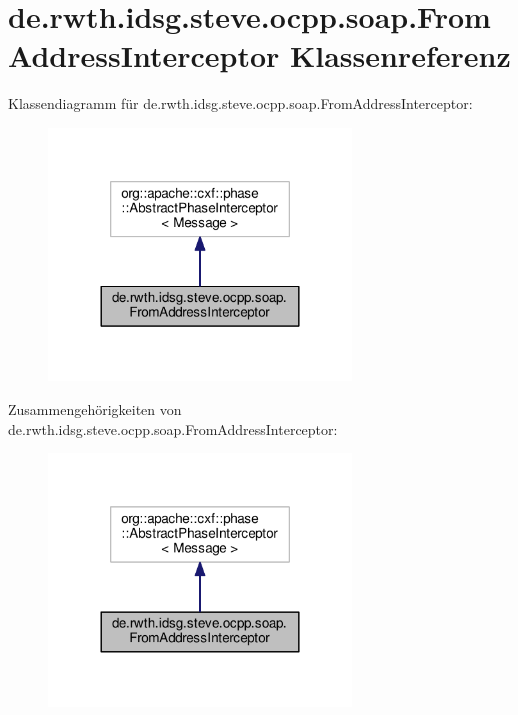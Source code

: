 \hypertarget{classde_1_1rwth_1_1idsg_1_1steve_1_1ocpp_1_1soap_1_1_from_address_interceptor}{\section{de.\-rwth.\-idsg.\-steve.\-ocpp.\-soap.\-From\-Address\-Interceptor Klassenreferenz}
\label{classde_1_1rwth_1_1idsg_1_1steve_1_1ocpp_1_1soap_1_1_from_address_interceptor}
}


Klassendiagramm für de.\-rwth.\-idsg.\-steve.\-ocpp.\-soap.\-From\-Address\-Interceptor\-:\nopagebreak
\begin{figure}[H]
\begin{center}
\leavevmode
\includegraphics[width=228pt]{classde_1_1rwth_1_1idsg_1_1steve_1_1ocpp_1_1soap_1_1_from_address_interceptor__inherit__graph}
\end{center}
\end{figure}


Zusammengehörigkeiten von de.\-rwth.\-idsg.\-steve.\-ocpp.\-soap.\-From\-Address\-Interceptor\-:\nopagebreak
\begin{figure}[H]
\begin{center}
\leavevmode
\includegraphics[width=228pt]{classde_1_1rwth_1_1idsg_1_1steve_1_1ocpp_1_1soap_1_1_from_address_interceptor__coll__graph}
\end{center}
\end{figure}
